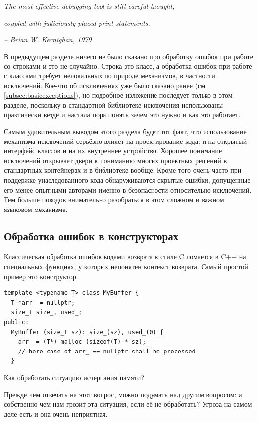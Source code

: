\documentclass[a4paper,12pt,oneside]{book}
\begin{document}
\hfill\textit{The most effective debugging tool is still careful thought,}

\hfill\textit{coupled with judiciously placed print statements.}{\vspace{0.5em}}

\hfill\textit{-- Brian W. Kernighan, 1979}

В предыдущем разделе ничего не было сказано про обработку ошибок при работе со строками и это не случайно. Строка это класс, а обработка ошибок при работе с классами требует нелокальных по природе механизмов, в частности исключений. Кое-что об исключениях уже было сказано ранее (см. \ref{subsec:basicexceptions}), но подробное изложение последует только в этом разделе, поскольку в стандартной библиотеке исключения использованы практически везде и настала пора понять зачем это нужно и как это работает.

Самым удивительным выводом этого раздела будет тот факт, что использование механизма исключений серьёзно влияет на проектирование кода: и на открытый интерфейс классов и на их внутреннее устройство. Хорошее понимание исключений открывает двери к пониманию многих проектных решений в стандартных контейнерах и в библиотеке вообще. Кроме того очень часто при поддержке унаследованного кода обнаруживаются скрытые ошибки, допущенные его менее опытными авторами именно в безопасности относительно исключений. Тем больше поводов внимательно разобраться в этом сложном и важном языковом механизме.

\subsection{Обработка ошибок в конструкторах}\label{subsub:ctorerrs}

Классическая обработка ошибок кодами возврата в стиле C ломается в C++ на специальных функциях, у которых непонятен контекст возврата. Самый простой пример это конструктор.

\begin{lstlisting}
template <typename T> class MyBuffer {
  T *arr_ = nullptr;
  size_t size_, used_;
public:
  MyBuffer (size_t sz): size_(sz), used_(0) {
    arr_ = (T*) malloc (sizeof(T) * sz);
    // here case of arr_ == nullptr shall be processed
  }
\end{lstlisting}

Как обработать ситуацию исчерпания памяти? 

Прежде чем отвечать на этот вопрос, можно подумать над другим вопросом: а собственно чем нам грозит эта ситуация, если её не обработать? Угроза на самом деле есть и она очень неприятная.
\end{document}
